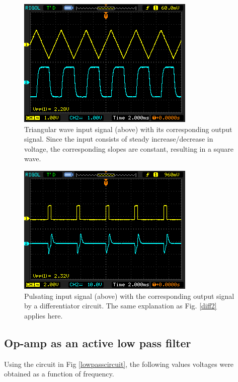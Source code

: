     \begin{figure}[H]
        \centering
        \includegraphics[width=0.75\columnwidth]{images/diff23.png}
        \caption{Triangular wave input signal (above) with its corresponding output signal. Since the input consists of steady increase/decrease in voltage, the corresponding slopes are constant, resulting in a square wave.}
        \label{diff3}
    \end{figure}

    \begin{figure}[H]
        \centering
        \includegraphics[width=0.75\columnwidth]{images/diff4.png}
        \caption{Pulsating input signal (above) with the corresponding output signal by a differentiator circuit. The same explanation as Fig. \ref{diff2} applies here.}
        \label{diff4}
    \end{figure}

\subsection{Op-amp as an active low pass filter}
    Using the circuit in Fig \ref{lowpasscircuit}, the following values voltages were obtained as a function of frequency.

